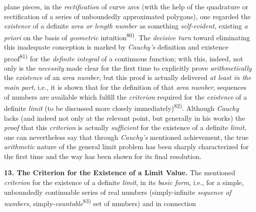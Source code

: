 \thispagestyle{fancy}

\vspace{0.5cm}

plane pieces, in the \textit{rectification} of curve arcs (with the help of the quadrature or rectification of a series of unboundedly approximated polygons), one regarded the \textit{existence} of a definite \textit{area or length number} as something \textit{self-evident}, existing \textit{a priori} on the basis of \textit{geometric} intuition\textsuperscript{80)}. The \textit{decisive turn} toward eliminating this inadequate conception is marked by \textit{Cauchy's} definition and existence proof\textsuperscript{81)} for the \textit{definite integral} of a continuous function; with this, indeed, not only is the \textit{necessity} made clear for the first time to explicitly prove \textit{arithmetically} the \textit{existence} of an \textit{area number}, but this proof is actually delivered \textit{at least in the main part}, i.e., it is shown that for the definition of that \textit{area number}, sequences of numbers are available which fulfill the \textit{criterion} required for the \textit{existence} of a definite \textit{limit} (to be discussed more closely immediately)\textsuperscript{82)}. Although \textit{Cauchy} lacks (and indeed not only at the relevant point, but generally in his works) the \textit{proof} that this \textit{criterion} is actually \textit{sufficient} for the existence of a definite \textit{limit}, one can nevertheless say that through \textit{Cauchy's} mentioned achievement, the true \textit{arithmetic} nature of the general limit problem has been sharply characterized for the first time and the way has been shown for its final resolution.

\vspace{0.5cm}

\textbf{13. The Criterion for the Existence of a Limit Value.} The mentioned \textit{criterion} for the existence of a definite \textit{limit}, in its \textit{basic form}, i.e., for a simple, unboundedly continuable series of real numbers (simply-infinite \textit{sequence of numbers}, simply-\textit{countable}\textsuperscript{83)} set of numbers) and in connection


